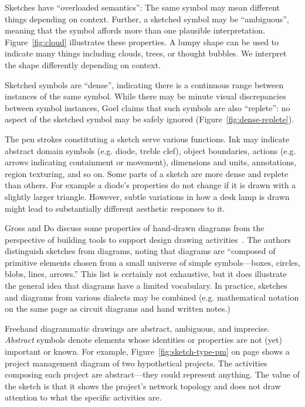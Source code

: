 Sketches have ``overloaded semantics'': The same symbol may mean
different things depending on context. Further, a sketched symbol may
be ``ambiguous'', meaning that the symbol affords more than one
plausible interpretation.  Figure~\ref{fig:cloud} illustrates these
properties. A lumpy shape can be used to indicate many things
including clouds, trees, or thought bubbles. We interpret the shape
differently depending on context.

Sketched symbols are ``dense'', indicating there is a continuous range
between instances of the same symbol. While there may be minute visual
discrepancies between symbol instances, Goel claims that such symbols
are also ``replete'': no aspect of the sketched symbol may be safely
ignored (Figure~\ref{fig:dense-replete}).

The pen strokes constituting a sketch serve various functions. Ink may
indicate abstract domain symbols (e.g. diode, treble clef), object
boundaries, actions (e.g. arrows indicating containment or movement),
dimensions and units, annotations, region texturing, and so on. Some
parts of a sketch are more dense and replete than others. For example
a diode's properties do not change if it is drawn with a slightly
larger triangle. However, subtle variations in how a desk lamp is
drawn might lead to substantially different aesthetic responses to it.



Gross and Do discuss some properties of hand-drawn diagrams from the
perspective of building tools to support design drawing
activities~\cite{gross-ecn-uist}. The authors distinguish sketches
from diagrams, noting that diagrams are ``composed of primitive
elements chosen from a small universe of simple symbols---boxes,
circles, blobs, lines, arrows.'' This list is certainly not
exhaustive, but it does illustrate the general idea that diagrams have
a limited vocabulary. In practice, sketches and diagrams from various
dialects may be combined (e.g. mathematical notation on the same page
as circuit diagrams and hand written notes.)

Freehand diagrammatic drawings are abstract, ambiguous, and
imprecise. \textit{Abstract} symbols denote elements whose identities
or properties are not (yet) important or known. For example,
Figure~\ref{fig:sketch-type-pm} on page \pageref{fig:sketch-type-pm}
shows a project management diagram of two hypothetical projects. The
activities composing each project are abstract---they could represent
anything. The value of the sketch is that it shows the project's
network topology and does not draw attention to what the specific
activities are. 

